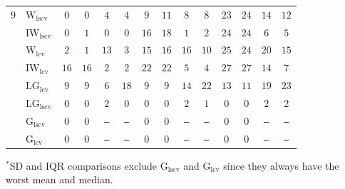 \begin{table}[!htp]
\begin{tabular}{clcccccccccccc}
\midrule
$9$ & $\mathrm{W}_{\mathrm{lscv}}$ & $0$ & $0$ & $4$ & \cellcolor{black!10}$4$ & $9$ & $11$ & $8$ & $8$ & $23$ & \cellcolor{black!10}$24$ & $14$ & $12$ \\
 & $\mathrm{IW}_{\mathrm{lscv}}$ & $0$ & $1$ & $0$ & $0$ & \cellcolor{black!10}$16$ & \cellcolor{black!10}$18$ & $1$ & $2$ & $24$ & \cellcolor{black!10}$24$ & $6$ & $5$ \\
 & $\mathrm{W}_{\mathrm{lcv}}$ & $2$ & $1$ & \cellcolor{black!30}$13$ & $3$ & $15$ & $16$ & \cellcolor{black!30}$16$ & \cellcolor{black!10}$10$ & \cellcolor{black!10}$25$ & \cellcolor{black!10}$24$ & \cellcolor{black!30}$20$ & \cellcolor{black!10}$15$ \\
 & $\mathrm{IW}_{\mathrm{lcv}}$ & \cellcolor{black!30}$16$ & \cellcolor{black!30}$16$ & $2$ & $2$ & \cellcolor{black!30}$22$ & \cellcolor{black!30}$22$ & $5$ & $4$ & \cellcolor{black!30}$27$ & \cellcolor{black!30}$27$ & $14$ & $7$ \\
 & $\mathrm{LG}_{\mathrm{lcv}}$ & \cellcolor{black!10}$9$ & \cellcolor{black!10}$9$ & \cellcolor{black!10}$6$ & \cellcolor{black!30}$18$ & $9$ & $9$ & \cellcolor{black!10}$14$ & \cellcolor{black!30}$22$ & $13$ & $11$ & \cellcolor{black!10}$19$ & \cellcolor{black!30}$23$ \\
 & $\mathrm{LG}_{\mathrm{lscv}}$ & $0$ & $0$ & $2$ & $0$ & $0$ & $0$ & $2$ & $1$ & $0$ & $0$ & $2$ & $2$ \\
 & $\mathrm{G}_{\mathrm{lscv}}$ & $0$ & $0$ & \texttt{---} & \texttt{---} & $0$ & $0$ & \texttt{---} & \texttt{---} & $0$ & $0$ & \texttt{---} & \texttt{---} \\
 & $\mathrm{G}_{\mathrm{lcv}}$ & $0$ & $0$ & \texttt{---} & \texttt{---} & $0$ & $0$ & \texttt{---} & \texttt{---} & $0$ & $0$ & \texttt{---} & \texttt{---} \\
\bottomrule
\end{tabular}

\smallskip
\begin{minipage}{0.98\textwidth}
\fontsize{7.9}{7}\selectfont
\vspace{-4mm}$^{*}$SD and IQR comparisons exclude $\mathrm{G}_{\mathrm{lscv}}$ and $\mathrm{G}_{\mathrm{lcv}}$ since they always have the worst mean and median.\vspace{-7mm}
\end{minipage}
\end{table}
